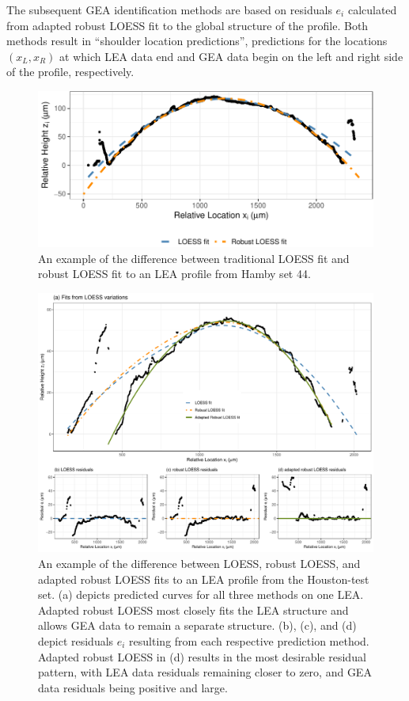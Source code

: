 \documentclass[12pt]{article}
\begin{document}
The subsequent GEA identification methods are based on residuals \(e_i\)
calculated from adapted robust LOESS fit to the global structure of the
profile. Both methods result in ``shoulder location predictions'',
predictions for the locations \((x_L, x_R)\) at which LEA data end and
GEA data begin on the left and right side of the profile, respectively.

\begin{figure}
\centering
\includegraphics{writeup_files/figure-latex/loess-vs-locfit-1.pdf}
\caption{\label{loess-vs-locfit}An example of the difference between
traditional LOESS fit and robust LOESS fit to an LEA profile from Hamby
set 44.}
\end{figure}

\begin{figure}
\centering
\includegraphics[width=\textwidth]{../images/loess_comparison_plot_all_wide}
\caption{An example of the difference between LOESS, robust LOESS, and adapted robust LOESS fits to an LEA profile from the Houston-test set. (a) depicts predicted curves for all three methods on one LEA. Adapted robust LOESS most closely fits the LEA structure and allows GEA data to remain a separate structure. (b), (c), and (d) depict residuals $e_i$ resulting from each respective prediction method. Adapted robust LOESS in (d) results in the most desirable residual pattern, with LEA data residuals remaining closer to zero, and GEA data residuals being positive and large.}
\label{houston-adapted-rlo-pdf}
\end{figure}
\end{document}
